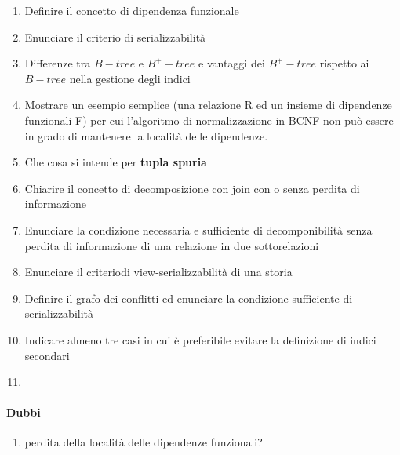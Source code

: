 \documentclass[12pt]{article}
\begin{document}
\begin{enumerate}
    \item Definire il concetto di dipendenza funzionale
    \item Enunciare il criterio di serializzabilità
    \item Differenze tra $B-tree$ e $B^{+}-tree$ e vantaggi dei $B^{+}-tree$ rispetto ai $B-tree$ nella gestione degli indici
    \item Mostrare un esempio semplice (una relazione R ed un insieme di dipendenze funzionali F) per cui  l’algoritmo di normalizzazione in BCNF non può essere in grado di mantenere la località delle dipendenze. 
    \item Che cosa si intende per \textbf{tupla spuria}
    \item Chiarire il concetto di decomposizione con join con o senza perdita di informazione
    \item Enunciare la condizione necessaria e sufficiente di decomponibilità senza perdita di informazione di una relazione in due sottorelazioni
    \item Enunciare il criteriodi view-serializzabilità di una storia
    \item Definire il grafo dei conflitti ed enunciare la condizione sufficiente di serializzabilità
    \item Indicare almeno tre casi in cui è preferibile evitare la definizione di indici secondari
    \item 
\end{enumerate}

\paragraph{Dubbi}
\begin{enumerate}
    \item perdita della località delle dipendenze funzionali?
\end{enumerate}
\end{document}
